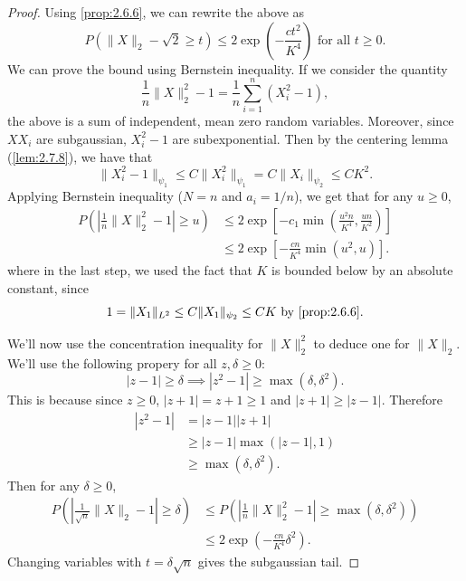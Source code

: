 \begin{proof}
Using \cref{prop:2.6.6}, we can rewrite the above as 
\[ P(\lVert X \rVert_2 - \sqrt{2} \geq t) \leq 2\exp{\left( -\frac{ct^2}{K^4} \right)} \text{ for all } 
t \geq 0. \]
We can prove the bound using Bernstein inequality. If we consider the quantity 
\[ \frac{1}{n}\lVert X \rVert_{2}^2 - 1 = \frac{1}{n}\sum_{i = 1}^{n} (X_i^2 - 1), \]
the above is a sum of independent, mean zero random variables. Moreover, since $XX_i$ are subgaussian, 
$X_i^2 - 1$ are subexponential. Then by the centering lemma (\cref{lem:2.7.8}), we have that 
\[ \lVert X_i^2 - 1 \rVert_{\psi_1} \leq C \lVert X_i^2 \rVert_{\psi_1} 
= C \lVert X_i \rVert_{\psi_2} \leq CK^2. \]
Applying Bernstein inequality ($N = n$ and $a_i = 1/n$), we get that for any $u \geq 0$, 
\begin{align*}
	P \left( \left| \frac{1}{n}\lVert X \rVert_{2}^2 - 1 \right| \geq u \right) 
	&\leq 2\exp{\left[ -c_1 \min_{} \left( \frac{u^2 n}{K^4}, \frac{un}{K^2} \right) \right]} \\
	&\leq 2 \exp{\left[ -\frac{cn}{K^4} \min_{}(u^2, u) \right]}.
\end{align*}
where in the last step, we used the fact that $K$ is bounded below by an absolute constant, since 
\[ 1 = \lVert X_1 \rVert_{L^2} \leq C \lVert X_1 \rVert_{\psi_2} \leq CK \text{ by } \cref{prop:2.6.6}. \]

We'll now use the concentration inequality for $\lVert X \rVert_{2}^2$ to deduce one for 
$\lVert X \rVert_{2}$. We'll use the following propery for all $z, \delta \geq 0$: 
\[ |z - 1| \geq \delta \implies |z^2 - 1| \geq \max_{}(\delta, \delta^2). \]
This is because since $z \geq 0$, $|z + 1| = z + 1 \geq 1$ and $|z + 1| \geq |z - 1|$. Therefore 
\begin{align*}
	|z^2 - 1| 
	&= |z - 1||z + 1| \\
	&\geq |z - 1| \max_{}(|z - 1|, 1) \\
	&\geq \max_{}(\delta, \delta^2).
\end{align*}
Then for any $\delta \geq 0$, 
\begin{align*}
	P \left( \left| \frac{1}{\sqrt{n}} \lVert X \rVert_{2} - 1 \right|  \geq \delta \right) 
	&\leq P \left( \left| \frac{1}{n} \lVert X \rVert_{2}^2 - 1 \right| \geq \max_{}(\delta, \delta^2) \right) \\
	&\leq 2\exp{\left( -\frac{cn}{K^4} \delta^2 \right)}.
\end{align*}
Changing variables with $t = \delta \sqrt{n}$ gives the subgaussian tail.
\end{proof}

